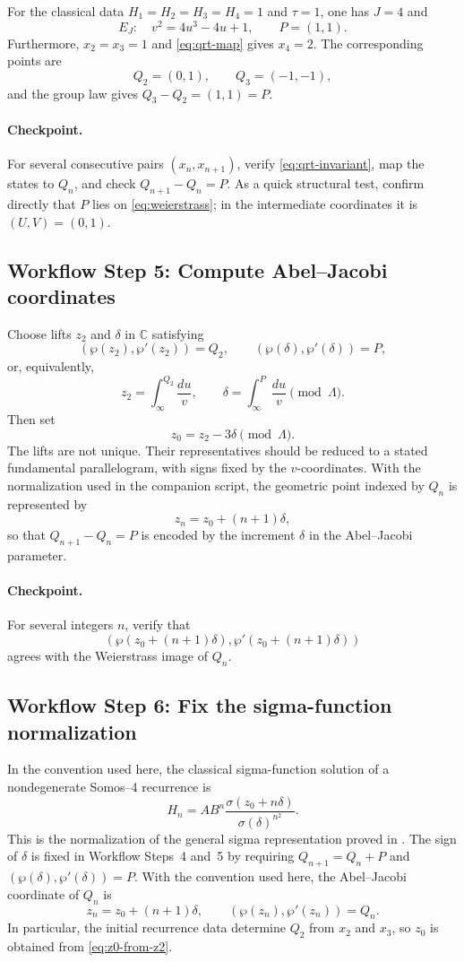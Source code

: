 \documentclass[11pt]{article}
\newcommand{\workflowstep}[1]{\subsection{Workflow Step #1}}
\newcommand{\taupar}{\tau}
\begin{document}
For the classical data $H_1=H_2=H_3=H_4=1$ and $\taupar=1$, one has $J=4$ and
\[
  E_J:\quad v^2=4u^3-4u+1,
  \qquad P=(1,1).
\]
Furthermore, $x_2=x_3=1$ and \cref{eq:qrt-map} gives $x_4=2$. The
corresponding points are
\[
  Q_2=(0,1),
  \qquad Q_3=(-1,-1),
\]
and the group law gives $Q_3-Q_2=(1,1)=P$.

\paragraph{Checkpoint.}
For several consecutive pairs $(x_n,x_{n+1})$, verify
\cref{eq:qrt-invariant}, map the states to $Q_n$, and check
$Q_{n+1}-Q_n=P$. As a quick structural test, confirm directly that $P$ lies
on \cref{eq:weierstrass}; in the intermediate coordinates it is
$(U,V)=(0,1)$.

\workflowstep{5: Compute Abel--Jacobi coordinates}
Choose lifts $z_2$ and $\delta$ in $\mathbb C$ satisfying
\[
  (\wp(z_2),\wp'(z_2))=Q_2,
  \qquad
  (\wp(\delta),\wp'(\delta))=P,
\]
or, equivalently,
\[
  z_2=\int_{\infty}^{Q_2}\frac{du}{v},
  \qquad
  \delta=\int_{\infty}^{P}\frac{du}{v}\pmod{\Lambda}.
\]
Then set
\begin{equation}
  z_0=z_2-3\delta \pmod{\Lambda}.
  \label{eq:z0-from-z2}
\end{equation}
The lifts are not unique. Their representatives should be reduced to a
stated fundamental parallelogram, with signs fixed by the $v$-coordinates.
With the normalization used in the companion script, the geometric point
indexed by $Q_n$ is represented by
\[
  z_n=z_0+(n+1)\delta,
\]
so that $Q_{n+1}-Q_n=P$ is encoded by the increment $\delta$ in the Abel--Jacobi
parameter.

\paragraph{Checkpoint.}
For several integers $n$, verify that
\[
  (\wp(z_0+(n+1)\delta),\wp'(z_0+(n+1)\delta))
\]
agrees with the Weierstrass image of $Q_n$.

\workflowstep{6: Fix the sigma-function normalization}
In the convention used here, the classical sigma-function solution of a
nondegenerate Somos--4 recurrence is
\begin{equation}
  H_n=A B^n
  \frac{\sigma(z_0+n\delta)}{\sigma(\delta)^{n^2}}.
  \label{eq:sigma}
\end{equation}
This is the normalization of the general sigma representation proved in
\cite{Hone2005}. The sign of $\delta$ is fixed in Workflow Steps~4 and~5 by
requiring $Q_{n+1}=Q_n+P$ and $(\wp(\delta),\wp'(\delta))=P$. With the
convention used here, the Abel--Jacobi coordinate of $Q_n$ is
\begin{equation}
  z_n=z_0+(n+1)\delta,
  \qquad
  (\wp(z_n),\wp'(z_n))=Q_n.
  \label{eq:sigma-indexing}
\end{equation}
In particular, the initial recurrence data determine $Q_2$ from $x_2$ and
$x_3$, so $z_0$ is obtained from \cref{eq:z0-from-z2}.
\end{document}
